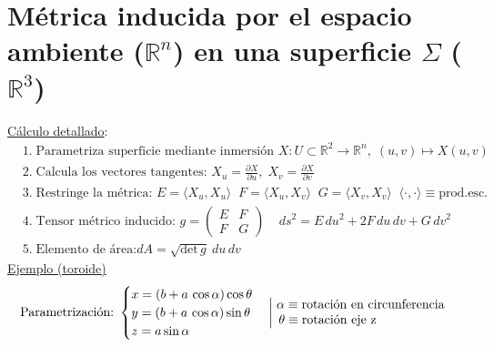 \section*{Métrica inducida por el espacio ambiente ($\mathbb{R}^n$) en una superficie $\Sigma$ ($\mathbb{R}^3$)}
\underline{Cálculo detallado}:
\begin{align*}
    &1.\;  \text{Parametriza superficie mediante inmersión } X:U\subset \mathbb{R}^2 \longrightarrow \mathbb{R}^n, \; (u,v)\mapsto X(u,v)\\
    &2. \;  \text{Calcula los vectores tangentes: }
    X_u = \frac{\partial X}{\partial u}, \; X_v= \frac{\partial X}{\partial 
    v}\\
    &3.\; \text{Restringe la métrica: } \!E\!=\! \langle X_u,X_u\rangle\;\; F\!=\! \langle X_u,X_v\rangle\; \; G\!=\! \langle X_v,X_v\rangle \;\; \langle\cdot ,\cdot\rangle\!\equiv\!\text{prod.esc.}\\
    &4.\; \text{Tensor métrico inducido: } g=
    \begin{pmatrix}
        E&F\\
        F&G
    \end{pmatrix}\; \; \; \; ds^2 = E\,du^2+ 2F\,du\,dv + G\, dv^2\\
    &5.\;  \text{Elemento de área:} dA= \sqrt{\text{det}\,g} \: du\,dv
\end{align*}
\underline{Ejemplo (toroide)} 
\begin{align*}
    &\text{Parametrización:}\hspace{-5pt}
    &\begin{cases} 
x= (b+a\,\cos\alpha)\cos\theta
\\
y= (b+a\,\cos\alpha)\sin\theta
\\
z= a\sin\alpha
\end{cases}
\left|
\hspace{-12pt}
\begin{array}{ll}
     & \alpha\equiv \text{rotación en circunferencia}\\
     &\, \theta\equiv \text{rotación eje z} 
\end{array}
\right.
\end{align*}
